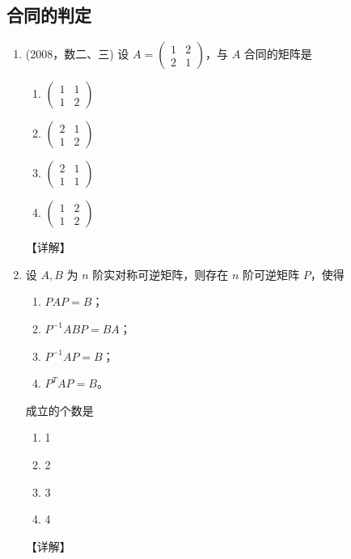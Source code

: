 \documentclass[12pt, a4paper, oneside, UTF8]{ctexbook}
\begin{document}
\subsection{合同的判定}

\begin{enumerate}[label=\arabic*.,start=4]
    \item (2008，数二、三) 设 $ A = \begin{pmatrix} 1 & 2 \\ 2 & 1 \end{pmatrix} $，与 $ A $ 合同的矩阵是
    \begin{enumerate}
        \item $ \begin{pmatrix} 1 & 1 \\ 1 & 2 \end{pmatrix} $
        \item $ \begin{pmatrix} 2 & 1 \\ 1 & 2 \end{pmatrix} $
        \item $ \begin{pmatrix} 2 & 1 \\ 1 & 1 \end{pmatrix} $
        \item $ \begin{pmatrix} 1 & 2 \\ 1 & 2 \end{pmatrix} $
    \end{enumerate}
    
    \begin{solution}
    【详解】
    \end{solution}
    
    \item 设 $ A, B $ 为 $ n $ 阶实对称可逆矩阵，则存在 $ n $ 阶可逆矩阵 $ P $，使得
    \begin{enumerate}
        \item $ P A P = B $；
        \item $ P^{-1} A B P = B A $；
        \item $ P^{-1} A P = B $；
        \item $ P^T A P = B $。
    \end{enumerate}
    成立的个数是
    \begin{enumerate}
        \item 1
        \item 2
        \item 3
        \item 4
    \end{enumerate}
    
    \begin{solution}
    【详解】
    \end{solution}
\end{enumerate}
\end{document}
